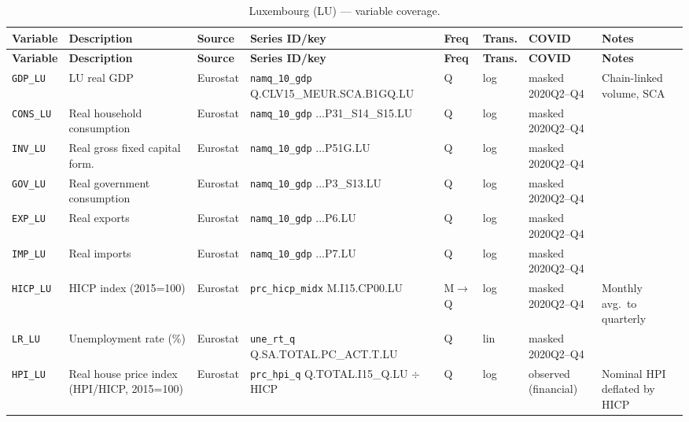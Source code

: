 {\footnotesize
\begin{longtable}{@{}p{1.9cm}p{2.9cm}p{1.5cm}p{2.7cm}p{0.7cm}p{1.0cm}p{1.6cm}p{2.4cm}@{}}
\caption{Luxembourg (LU) --- variable coverage.}\label{tab:data:LU}\\
\toprule
\textbf{Variable} & \textbf{Description} & \textbf{Source} & \textbf{Series ID/key} & \textbf{Freq} & \textbf{Trans.} & \textbf{COVID} & \textbf{Notes} \\
\midrule \endfirsthead
\toprule
\textbf{Variable} & \textbf{Description} & \textbf{Source} & \textbf{Series ID/key} & \textbf{Freq} & \textbf{Trans.} & \textbf{COVID} & \textbf{Notes} \\
\midrule \endhead
\bottomrule \endfoot
\texttt{GDP\_LU}      & LU real GDP                       & Eurostat & \texttt{namq\_10\_gdp} Q.\allowbreak CLV15\_MEUR.\allowbreak SCA.\allowbreak B1GQ.\allowbreak LU       & Q & log & masked 2020Q2--Q4 & Chain-linked volume, SCA \\
\texttt{CONS\_LU}     & Real household consumption        & Eurostat & \texttt{namq\_10\_gdp} ...P31\_S14\_S15.LU             & Q & log & masked 2020Q2--Q4 & \\
\texttt{INV\_LU}      & Real gross fixed capital form.    & Eurostat & \texttt{namq\_10\_gdp} ...P51G.LU                      & Q & log & masked 2020Q2--Q4 & \\
\texttt{GOV\_LU}      & Real government consumption       & Eurostat & \texttt{namq\_10\_gdp} ...P3\_S13.LU                   & Q & log & masked 2020Q2--Q4 & \\
\texttt{EXP\_LU}      & Real exports                      & Eurostat & \texttt{namq\_10\_gdp} ...P6.LU                        & Q & log & masked 2020Q2--Q4 & \\
\texttt{IMP\_LU}      & Real imports                      & Eurostat & \texttt{namq\_10\_gdp} ...P7.LU                        & Q & log & masked 2020Q2--Q4 & \\
\texttt{HICP\_LU}     & HICP index (2015=100)             & Eurostat & \texttt{prc\_hicp\_midx} M.I15.CP00.LU                 & M$\to$Q & log & masked 2020Q2--Q4 & Monthly avg.\ to quarterly \\
\texttt{LR\_LU}       & Unemployment rate (\%)            & Eurostat & \texttt{une\_rt\_q} Q.SA.TOTAL.PC\_ACT.T.LU            & Q & lin & masked 2020Q2--Q4 & \\
\texttt{HPI\_LU}      & Real house price index (HPI/HICP, 2015=100) & Eurostat & \texttt{prc\_hpi\_q} Q.TOTAL.I15\_Q.LU $\div$ HICP & Q & log & observed (financial) & Nominal HPI deflated by HICP \\

\end{longtable}}
